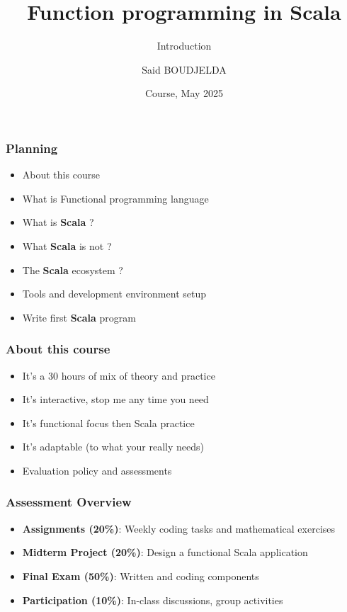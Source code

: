 \documentclass{beamer}
\title[Scala] %
{Function programming in Scala}
\subtitle{Introduction}
\author[Said BOUDJELDA] %
{Said BOUDJELDA}
\institute[efrei] %
{
  Senior Software Engineer @SCIAM\\
  Email : mohamed-said.boudjelda@intervenants.efrei.net \\ 
  Follow me on GitHub @bmscomp
}
\date[efrei 2025] %
{Course, May 2025}
\begin{document}
\frame{\titlepage}

\begin{frame}
\frametitle{Planning}


\begin{itemize}
    \item About this course 
    \item What is Functional programming language
    \item What is \textbf{Scala} ? 
    \item What \textbf{Scala} is not ? 
    \item The \textbf{Scala} ecosystem ? 
    \item Tools and development environment setup
    \item Write first \textbf{Scala} program
\end{itemize}
\end{frame}


\begin{frame}
\frametitle{About this course}

\begin{itemize}
    \item It's a 30 hours of mix of theory and practice
    \item It's interactive, stop me any time you need
    \item It's functional focus then Scala practice
    \item It's adaptable (to what your really needs)
    \item Evaluation policy and assessments
\end{itemize}
\end{frame}


\begin{frame}
\frametitle{Assessment Overview}

\begin{itemize}
    \item \textbf{Assignments (20\%)}: Weekly coding tasks and mathematical exercises
    \item \textbf{Midterm Project (20\%)}: Design a functional Scala application
    \item \textbf{Final Exam (50\%)}: Written and coding components
    \item \textbf{Participation (10\%)}: In-class discussions, group activities
\end{itemize}
\end{frame}
\end{document}
